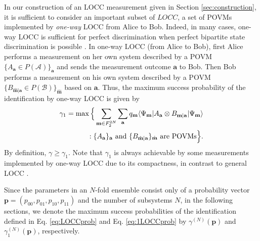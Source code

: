 \documentclass[aps,prx,twocolumn,showpacs,amsmath,notitlepage,amssymb,superscriptaddress]{revtex4-1}
\newcommand{\bra}[1]{\langle {#1} |}
\newcommand{\ket}[1]{| {#1} \rangle}
\begin{document}
In our construction of an LOCC measurement given in Section \ref{sec:construction}, it is sufficient to consider an important subset of $LOCC$, a set of POVMs implemented by {\it one-way} LOCC from Alice to Bob.
Indeed, in many cases, one-way LOCC is sufficient for perfect discrimination when perfect bipartite state discrimination is possible \cite{twostatediscrimination1, localdiscrimination, optimalprob2, optimalprob5}.
In one-way LOCC (from Alice to Bob), first Alice performs a measurement on her own system described by a POVM $\{A_{\mathbf{a}}\in P(\mathcal{A})\}_{\mathbf{a}}$ and sends the measurement outcome $\mathbf{a}$ to Bob. Then Bob performs a measurement on his own system described by a POVM $\{B_{\hat{\mathbf{m}}|\mathbf{a}}\in P(\mathcal{B})\}_{\hat{\mathbf{m}}}$ based on $\mathbf{a}$. Thus, the maximum success probability of the identification by one-way LOCC is given by
\begin{eqnarray}
  \gamma_1=\max\Big\{\sum_{\mathbf{m}\in F_2^{2N}}\sum_{\mathbf{a}} q_{\mathbf{m}}\bra{\Psi_{\mathbf{m}}}A_{\mathbf{a}}\otimes B_{\mathbf{m}|\mathbf{a}}\ket{\Psi_{\mathbf{m}}}\nonumber\\
 :\{A_{\mathbf{a}}\}_{\mathbf{a}}{\rm \ and\ }\{B_{\hat{\mathbf{m}}|\mathbf{a}}\}_{\hat{\mathbf{m}}}{\rm \ are\ POVMs}\Big\}.
\label{eq:1LOCCprob}
\end{eqnarray}
By definition, $\gamma\geq\gamma_1$. Note that $\gamma_1$ is always achievable by some measurements implemented by one-way LOCC due to its compactness, in contrast to general LOCC \cite{productstate4, CLMOW}.

Since the parameters in an $N$-fold ensemble consist only of a probability vector $\mathbf{p}=(p_{00},p_{01},p_{10},p_{11})$ and the number of subsystems $N$, in the following sections, we denote the maximum success probabilities of the identification defined in Eq. \eqref{eq:LOCCprob} and Eq. \eqref{eq:1LOCCprob} by $\gamma^{(N)}(\mathbf{p})$ and $\gamma_1^{(N)}(\mathbf{p})$, respectively.
\end{document}
